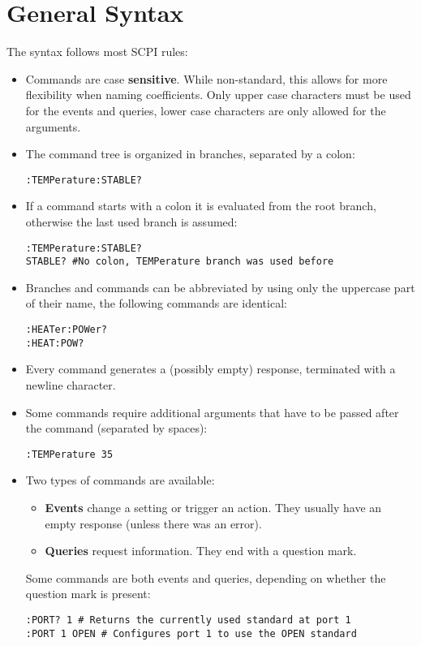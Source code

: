\documentclass[a4paper,11pt]{article}
\begin{document}
\section{General Syntax}
The syntax follows most SCPI rules:
\begin{itemize}
\item Commands are case \textbf{sensitive}. While non-standard, this allows for more flexibility when naming coefficients. Only upper case characters must be used for the events and queries, lower case characters are only allowed for the arguments.
\item The command tree is organized in branches, separated by a colon:
\begin{lstlisting}
:TEMPerature:STABLE?
\end{lstlisting}
\item If a command starts with a colon it is evaluated from the root branch, otherwise the last used branch is assumed:
\begin{lstlisting}
:TEMPerature:STABLE?
STABLE? #No colon, TEMPerature branch was used before
\end{lstlisting}
\item Branches and commands can be abbreviated by using only the uppercase part of their name, the following commands are identical:
\begin{lstlisting}
:HEATer:POWer?
:HEAT:POW?
\end{lstlisting}
\item Every command generates a (possibly empty) response, terminated with a newline character.
\item Some commands require additional arguments that have to be passed after the command (separated by spaces):
\begin{lstlisting}
:TEMPerature 35
\end{lstlisting}
\item Two types of commands are available:
\begin{itemize}
\item \textbf{Events} change a setting or trigger an action. They usually have an empty response (unless there was an error).
\item \textbf{Queries} request information. They end with a question mark.
\end{itemize}
Some commands are both events and queries, depending on whether the question mark is present:
\begin{lstlisting}
:PORT? 1 # Returns the currently used standard at port 1
:PORT 1 OPEN # Configures port 1 to use the OPEN standard
\end{lstlisting}
\end{itemize}
\end{document}
